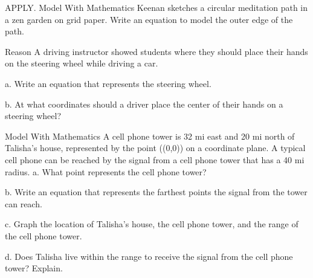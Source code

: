 \documentclass{article}
\newenvironment{practice}[2]{}{}        %
\newcommand{\answer}[1]{}               %
\newcommand{\placeholder}[2]{}          %
\newcommand{\te}[1]{}                   %
\begin{document}
\begin{practice}{34}{2}
APPLY. Model With Mathematics Keenan sketches a circular meditation path in a zen garden on grid paper. Write an equation to model the outer edge of the path.
\placeholder{diagram}{Zen garden illustration on an unlabeled unit coordinate grid. Black double-arrow x and y axes; red filled center labeled (5,-3). A black circle of radius 5 surrounds a gray disk; a horizontal black double-arrow radius from center to left edge is labeled 5 ft. An orange annulus extends outside the black circle to radius about 6.5; green lawn and plants surround it.}
\answer{((x-5)^2+(y+3)^2=25)}
\te{Printed key models the black circle with radius 5; likely the intended edge is that boundary, although the orange path extends outside it in the illustration.}
\end{practice}
\begin{practice}{35}{2}
Reason A driving instructor showed students where they should place their hands on the steering wheel while driving a car.
\placeholder{diagram}{Brown steering wheel with gray central hub, labeled center (0,0), black vertical radius down labeled 6. Hands are placed at lower left and lower right intersections with a horizontal black double-arrow line labeled y=-3.}
a. Write an equation that represents the steering wheel.
\answer{(x^2+y^2=36)}
b. At what coordinates should a driver place the center of their hands on a steering wheel?
\answer{((-3\sqrt{3},-3)) and ((3\sqrt{3},-3))}
\end{practice}
\begin{practice}{36}{2}
Model With Mathematics A cell phone tower is 32 mi east and 20 mi north of Talisha's house, represented by the point ((0,0)) on a coordinate plane. A typical cell phone can be reached by the signal from a cell phone tower that has a 40 mi radius.
a. What point represents the cell phone tower?
\answer{((32,20))}
b. Write an equation that represents the farthest points the signal from the tower can reach.
\answer{((x-32)^2+(y-20)^2=1600)}
c. Graph the location of Talisha's house, the cell phone tower, and the range of the cell phone tower.
\answer{See graph.}
\placeholder{graph}{Answer 36c: Grid spaced by 10, black double-arrow x and y axes, O at origin, window x [-20,80], y [-30,70], x labels 20,40,60, y labels -20,20,40,60. Red circle with radius 40 centered at filled point (32,20) labeled Cell Tower. Filled red point at origin labeled Talisha's House.}
d. Does Talisha live within the range to receive the signal from the cell phone tower? Explain.
\answer{Yes; the graph of the circle, which represents the range of the cell phone tower, includes Talisha's house.}
\end{practice}
\end{document}
